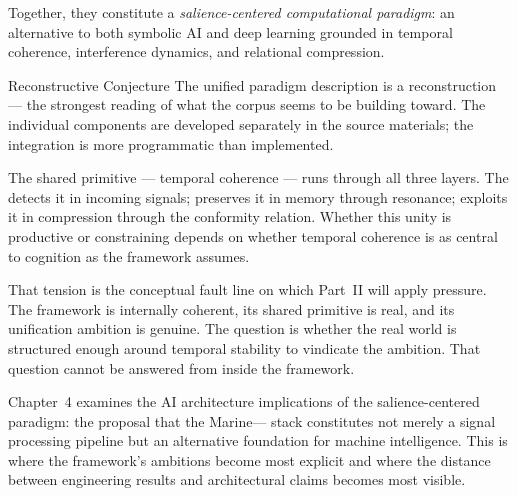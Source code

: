 Together, they constitute a \emph{salience-centered computational
paradigm}: an alternative to both symbolic AI and deep learning
grounded in temporal coherence, interference dynamics, and
relational compression.

\begin{epistemicstatus}{Reconstructive Conjecture}
The unified paradigm description is a reconstruction --- the
strongest reading of what the corpus seems to be building toward.
The individual components are developed separately in the source
materials; the integration is more programmatic than implemented.
\end{epistemicstatus}

The shared primitive --- temporal coherence --- runs through all
three layers. The \Marine{} detects it in incoming signals;
\MEMeight{} preserves it in memory through resonance; \HCFone{}
exploits it in compression through the conformity relation.
Whether this unity is productive or constraining depends on whether
temporal coherence is as central to cognition as the framework
assumes.

That tension is the conceptual fault line on which Part~II
will apply pressure. The framework is internally coherent,
its shared primitive is real, and its unification ambition
is genuine. The question is whether the real world is structured
enough around temporal stability to vindicate the ambition.
That question cannot be answered from inside the framework.

\medskip

Chapter~4 examines the AI architecture implications of the
salience-centered paradigm: the proposal that the
Marine--\MEMeight{}--\HCFone{} stack constitutes not merely a
signal processing pipeline but an alternative foundation for
machine intelligence. This is where the framework's ambitions
become most explicit and where the distance between engineering
results and architectural claims becomes most visible.
